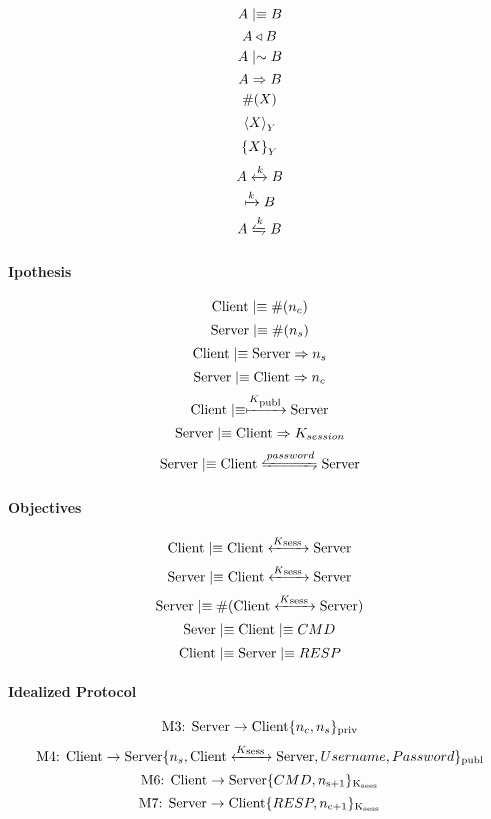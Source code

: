 \[A \mid\equiv B \]
\[A \triangleleft B \]
\[A \mid\sim B \]
\[A \Rightarrow B \]
\[\#(X)\]
\[{\langle X \rangle}_{Y}\]
\[{ \{ X \} }_{Y}\]
\[A \xleftrightarrow{k} B \]
\[\xmapsto{k} B\]
\[A \secret{k} B\]

\paragraph{Ipothesis}
\[\textnormal{Client} \mid\equiv \#(n_c)\]
\[\textnormal{Server} \mid\equiv \#(n_s)\]
\[\textnormal{Client} \mid\equiv \textnormal{Server} \Rightarrow n_s\]
\[\textnormal{Server} \mid\equiv \textnormal{Client} \Rightarrow n_c\]
\[\textnormal{Client} \mid\equiv \xmapsto{K\textsubscript{publ}} \textnormal{Server}\]
\[\textnormal{Server} \mid\equiv \textnormal{Client} \Rightarrow K_{session}\]
\[\textnormal{Server} \believes \textnormal{Client} \secret{password} \textnormal{Server}\]

\paragraph{Objectives}
\[\textnormal{Client} \mid\equiv \textnormal{Client} \xleftrightarrow{K\textsubscript{sess }} \textnormal{Server}\]
\[\textnormal{Server} \mid\equiv \textnormal{Client} \xleftrightarrow{K\textsubscript{sess }} \textnormal{Server}\]
\[\textnormal{Server} \mid\equiv \#(\textnormal{Client} \xleftrightarrow{K\textsubscript{sess }} \textnormal{Server})\]
\[\textnormal{Sever} \mid\equiv \textnormal{Client}\mid\equiv CMD\]
\[\textnormal{Client} \mid\equiv \textnormal{Server}\mid\equiv RESP\]

\paragraph{Idealized Protocol}
\[\textnormal{M3: Server} \rightarrow \textnormal{Client} \lbrace n_c,n_s \rbrace \textsubscript{priv} \]
\[\textnormal{M4: Client} \rightarrow \textnormal{Server} \lbrace n_s,\textnormal{Client} \xleftrightarrow{K\textsubscript{sess }} \textnormal{Server} ,Username,Password \rbrace \textsubscript{publ}\]
\[\textnormal{M6: Client} \rightarrow \textnormal{Server} \lbrace CMD,n\textsubscript{s+1} \rbrace \textsubscript{K\textsubscript{sees}}\]
\[\textnormal{M7: Server} \rightarrow \textnormal{Client} \lbrace RESP,n\textsubscript{c+1} \rbrace \textsubscript{K\textsubscript{sess}}\]
